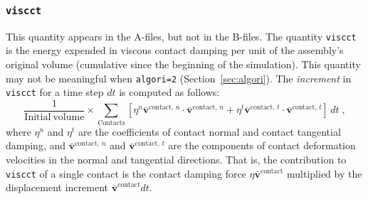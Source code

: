 \documentclass[letterpaper,11pt]{article}
\begin{document}
\subsubsection{\texttt{viscct}}
This quantity appears in the A-files, but not in the B-files.
The quantity \texttt{viscct} is
the energy expended in viscous contact damping per unit of the assembly's 
original volume
(cumulative since the beginning of the simulation).  This quantity may not be
meaningful
when \texttt{algori=2} (Section~\ref{sec:algori}).
The \emph{increment} in \texttt{viscct} for a time step $dt$
is computed as follows:
\begin{equation}
\frac{1}{\mathrm{Initial\ volume}}
\times
\sum_{\text{Contacts}} \!\!\!\!\left[
\eta^{n}\mathbf{\bar{v}}^{\text{contact, }n}
\cdot\mathbf{\bar{v}}^{\text{contact, }n}
+
\eta^{t}\mathbf{\bar{v}}^{\text{contact, }t}
\cdot\mathbf{\bar{v}}^{\text{contact, }t}
\right]\,dt\;,
\end{equation}
where $\eta^{n}$ and $\eta^{t}$ are the coefficients of contact normal and
contact tangential damping, and
$\mathbf{\bar{v}}^{\text{contact, }n}$ and
$\mathbf{\bar{v}}^{\text{contact, }t}$ are the components of
contact deformation velocities in the normal and tangential directions.
That is, the contribution to \texttt{viscct} of a single contact
is the contact damping force
$\eta\mathbf{\bar{v}}^{\text{contact}}$
multiplied by the displacement increment
$\mathbf{\bar{v}}^{\text{contact}}dt$.
%
\end{document}
